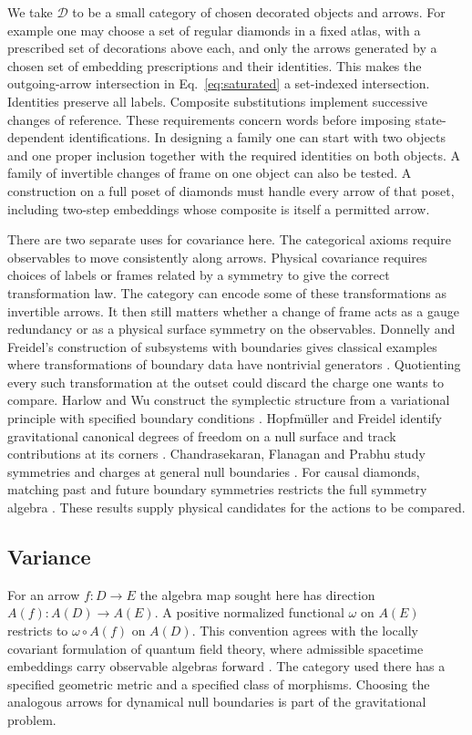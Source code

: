 \documentclass[11pt,letterpaper]{article}
\newcommand{\Dcat}{\mathcal D}
\begin{document}
We take $\Dcat$ to be a small category of chosen decorated objects and arrows. For example one may choose a set of regular diamonds in a fixed atlas, with a prescribed set of decorations above each, and only the arrows generated by a chosen set of embedding prescriptions and their identities. This makes the outgoing-arrow intersection in Eq.~\eqref{eq:saturated} a set-indexed intersection. Identities preserve all labels. Composite substitutions implement successive changes of reference. These requirements concern words before imposing state-dependent identifications. In designing a family one can start with two objects and one proper inclusion together with the required identities on both objects. A family of invertible changes of frame on one object can also be tested. A construction on a full poset of diamonds must handle every arrow of that poset, including two-step embeddings whose composite is itself a permitted arrow.

There are two separate uses for covariance here. The categorical axioms require observables to move consistently along arrows. Physical covariance requires choices of labels or frames related by a symmetry to give the correct transformation law. The category can encode some of these transformations as invertible arrows. It then still matters whether a change of frame acts as a gauge redundancy or as a physical surface symmetry on the observables. Donnelly and Freidel's construction of subsystems with boundaries gives classical examples where transformations of boundary data have nontrivial generators \cite{df}. Quotienting every such transformation at the outset could discard the charge one wants to compare. Harlow and Wu construct the symplectic structure from a variational principle with specified boundary conditions \cite{hw}. Hopfm\"uller and Freidel identify gravitational canonical degrees of freedom on a null surface and track contributions at its corners \cite{hf}. Chandrasekaran, Flanagan and Prabhu study symmetries and charges at general null boundaries \cite{cfp}. For causal diamonds, matching past and future boundary symmetries restricts the full symmetry algebra \cite{cp}. These results supply physical candidates for the actions to be compared.

\subsection{Variance}

For an arrow $f:D\to E$ the algebra map sought here has direction $A(f):A(D)\to A(E)$. A positive normalized functional $\omega$ on $A(E)$ restricts to $\omega\circ A(f)$ on $A(D)$. This convention agrees with the locally covariant formulation of quantum field theory, where admissible spacetime embeddings carry observable algebras forward \cite{bfv}. The category used there has a specified geometric metric and a specified class of morphisms. Choosing the analogous arrows for dynamical null boundaries is part of the gravitational problem.
\end{document}
